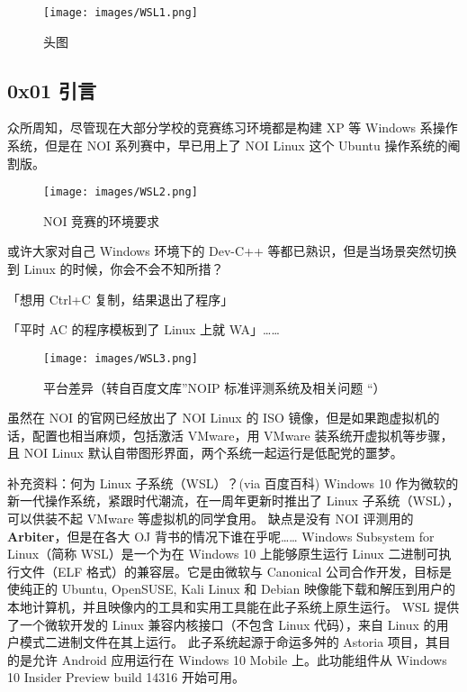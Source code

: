 
\begin{figure}[h]
\centering
\texttt{[image: images/WSL1.png]} 
\caption{头图}
\end{figure}

\hr

\subsection{0x01 引言}

众所周知，尽管现在大部分学校的竞赛练习环境都是构建 XP 等 Windows 系操作系统，但是在 NOI 系列赛中，早已用上了 NOI Linux 这个 Ubuntu 操作系统的阉割版。  

\begin{figure}[h]
\centering
\texttt{[image: images/WSL2.png]} 
\caption{NOI 竞赛的环境要求}
\end{figure}           



或许大家对自己 Windows 环境下的 Dev-C++ 等都已熟识，但是当场景突然切换到 Linux 的时候，你会不会不知所措？

\begin{QUOTE}{}{}
「想用 Ctrl+C 复制，结果退出了程序」  



「平时 AC 的程序模板到了 Linux 上就 WA」……
\end{QUOTE}

\begin{figure}[h]
\centering
\texttt{[image: images/WSL3.png]} 
\caption{平台差异（转自百度文库”NOIP 标准评测系统及相关问题 “）}
\end{figure}



虽然在 NOI 的官网已经放出了 NOI Linux 的 ISO 镜像，但是如果跑虚拟机的话，配置也相当麻烦，包括激活 VMware，用 VMware 装系统开虚拟机等步骤，且 NOI Linux 默认自带图形界面，两个系统一起运行是低配党的噩梦。

\begin{NOTE}{补充资料：何为 Linux 子系统（WSL）？(via 百度百科)}{}
Windows 10 作为微软的新一代操作系统，紧跟时代潮流，在一周年更新时推出了 Linux 子系统（WSL），可以供装不起 VMware 等虚拟机的同学食用。  缺点是没有 NOI 评测用的 \textbf{Arbiter}，但是在各大 OJ 背书的情况下谁在乎呢…… Windows Subsystem for Linux（简称 WSL）是一个为在 Windows 10 上能够原生运行 Linux 二进制可执行文件（ELF 格式）的兼容层。它是由微软与 Canonical 公司合作开发，目标是使纯正的 Ubuntu, OpenSUSE, Kali Linux 和 Debian 映像能下载和解压到用户的本地计算机，并且映像内的工具和实用工具能在此子系统上原生运行。   WSL 提供了一个微软开发的 Linux 兼容内核接口（不包含 Linux 代码），来自 Linux 的用户模式二进制文件在其上运行。   此子系统起源于命运多舛的 Astoria 项目，其目的是允许 Android 应用运行在 Windows 10 Mobile 上。此功能组件从 Windows 10 Insider Preview build 14316 开始可用。
\end{NOTE}


